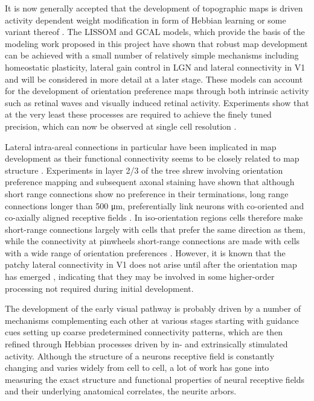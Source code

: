 It is now generally accepted that the development of topographic maps
is driven activity dependent weight modification in form of Hebbian
learning or some variant thereof \citep{Wolf}. The LISSOM and
GCAL models, which provide the basis of the modeling work proposed in
this project have shown that robust map development can be achieved
with a small number of relatively simple mechanisms including
homeostatic plasticity, lateral gain control in LGN and lateral
connectivity in V1 \citep{Stevens2013} and will be considered in more
detail at a later stage. These models can account for the development
of orientation preference maps through both intrinsic activity such as
retinal waves \citep{Bednar2003} and visually induced retinal
activity. Experiments show that at the very least these processes are
required to achieve the finely tuned precision, which can now be
observed at single cell resolution \citep{Ohki2005,White2007}.

Lateral intra-areal connections in particular have been implicated in
map development as their functional connectivity seems to be closely
related to map structure \citep{Gilbert1983}. Experiments in layer 2/3
of the tree shrew involving orientation preference mapping and
subsequent axonal staining have shown that although short range
connections show no preference in their terminations, long range
connections longer than 500 \si{\micro\metre}, preferentially link
neurons with co-oriented and co-axially aligned receptive fields
\citep{Bosking1997}. In iso-orientation regions cells therefore make
short-range connections largely with cells that prefer the same
direction as them, while the connectivity at pinwheels short-range
connections are made with cells with a wide range of orientation
preferences \citep{Ohki2006a}. However, it is known that the patchy
lateral connectivity in V1 does not arise until after the orientation
map has emerged \citep{Ruthazer1996}, indicating that they may be
involved in some higher-order processing not required during initial
development.

The development of the early visual pathway is probably driven by a
number of mechanisms complementing each other at various stages
starting with guidance cues setting up coarse predetermined
connectivity patterns, which are then refined through Hebbian
processes driven by in- and extrinsically stimulated
activity. Although the structure of a neurons receptive field is
constantly changing and varies widely from cell to cell, a lot of work
has gone into measuring the exact structure and functional properties
of neural receptive fields and their underlying anatomical correlates,
the neurite arbors.


